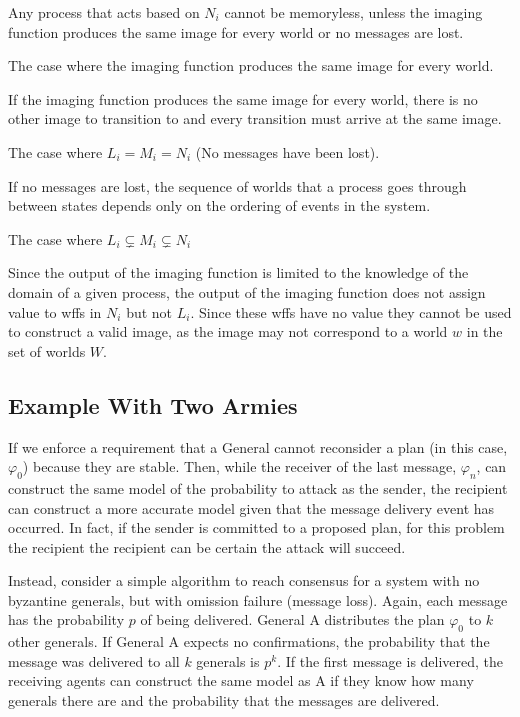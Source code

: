 \begin{thm}
Any process that acts based on $N_i$ cannot be memoryless, unless the imaging function produces the same image for every world or no messages are lost.
\end{thm}

\begin{case}
The case where the imaging function produces the same image for every world.
\end{case}

If the imaging function produces the same image for every world, there is no other image to transition to and every transition must arrive at the same image.

\begin{case}
The case where $L_i = M_i = N_i$ (No messages have been lost).
\end{case}

If no messages are lost, the sequence of worlds that a process goes through between states depends only on the ordering of events in the system. 

\begin{case}
The case where $L_i \subsetneq M_i \subsetneq N_i$
\end{case}

Since the output of the imaging function is limited to the knowledge of the domain of a given process, the output of the imaging function does not assign value to wffs in $N_i$ but not $L_i$. Since these wffs have no value they cannot be used to construct a valid image, as the image may not correspond to a world $w$ in the set of worlds $W$.

\subsection{Example With Two Armies}

If we enforce a requirement that a General cannot reconsider a plan (in this case, $\varphi_0$) because they are stable. Then, while the receiver of the last message, $\varphi_n$, can construct the same model of the probability to attack as the sender, the recipient can construct a more accurate model given that the message delivery event has occurred. In fact, if the sender is committed to a proposed plan, for this problem the recipient the recipient can be certain the attack will succeed.

Instead, consider a simple algorithm to reach consensus for a system with no byzantine generals, but with omission failure (message loss). Again, each message has the probability $p$ of being delivered. General A distributes the plan $\varphi_0$ to $k$ other generals. If General A expects no confirmations, the probability that the message was delivered to all $k$ generals is $p^k$. If the first message is delivered, the receiving agents can construct the same model as A if they know how many generals there are and the probability that the messages are delivered.

